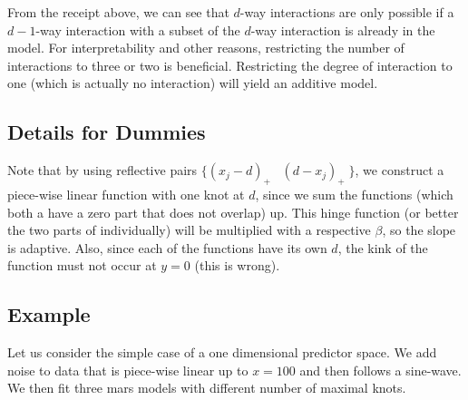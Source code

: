 \documentclass[]{book}
\begin{document}
From the receipt above, we can see that \(d\)-way interactions are only
possible if a \(d-1\)-way interaction with a subset of the \(d\)-way
interaction is already in the model. For interpretability and other
reasons, restricting the number of interactions to three or two is
beneficial. Restricting the degree of interaction to one (which is
actually no interaction) will yield an additive model.

\subsection{Details for Dummies}\label{details-for-dummies}

Note that by using reflective pairs
\(\big\{(x_j - d)_+ \;\;\; (d - x_j)_{+}\; \}\), we construct a
piece-wise linear function with one knot at \(d\), since we sum the
functions (which both a have a zero part that does not overlap) up. This
hinge function (or better the two parts of individually) will be
multiplied with a respective \(\beta\), so the slope is adaptive. Also,
since each of the functions have its own \(d\), the kink of the function
must not occur at \(y = 0\) (this is wrong).

\subsection{Example}\label{example}

Let us consider the simple case of a one dimensional predictor space. We
add noise to data that is piece-wise linear up to \(x= 100\) and then
follows a sine-wave. We then fit three mars models with different number
of maximal knots.
\end{document}
